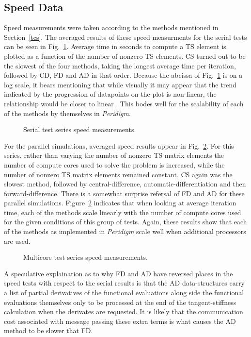\documentclass[preprint,12pt]{elsarticle}
\begin{document}
\subsection{Speed Data}
Speed measurements were taken according to the methods mentioned in Section~\ref{tcs}. The averaged results of these speed measurments for the serial tests can be seen in Fig.~\ref{fig:serial_speed}.  Average time in seconds to compute a TS element is plotted as a function of the number of nonzero TS elements.  CS turned out to be the slowest of the four methods, taking the longest average time per iteration,  followed by CD, FD and AD in that order. Because the abcissa of Fig.~\ref{fig:serial_speed} is on a log scale, it bears mentioning that while visually it may appear that the trend indicated by the progression of datapoints on the plot is non-linear, the relationship would be closer to linear . This bodes well for the scalability of each of the methods by themselves in \emph{Peridigm}. 
%
\begin{figure}[tbp]
  \centering
  \scalebox{1.0}{}
  \caption{Serial test series speed measurements.}
  \label{fig:serial_speed}
\end{figure}
%
For the parallel simulations, averaged speed results appear in Fig.~\ref{fig:multi_speed}. For this series, rather than varying the number of nonzero TS matrix elements the number of compute cores used to solve the problem is increased, while the number of nonzero TS matrix elements remained constant.  CS again was the slowest method, followed by central-difference, automatic-differentiation and then forward-difference.  There is a somewhat surprise refersal of FD and AD for these parallel simulations.  Figure~\ref{fig:multi_speed} indicates that when looking at average iteration time, each of the methods scale linearly with the number of compute cores used for the given conditions of this group of tests. Again, these results show that each of the methods as implemented in \emph{Peridigm} scale well when additional processors are used. 
%
\begin{figure}[tbp]
  \centering
  \scalebox{1.0}{}
  \caption{Multicore test series speed measurements.}
  \label{fig:multi_speed}
\end{figure}
%
A speculative explaination as to why FD and AD have reversed places in the speed tests with respect to the serial results is that the AD data-structures carry a list of partial derivatives of the functional evaluations along side the functional evaluations themselves only to be processed at the end of the tangent-stiffness calculation when the derivates are requested.  It is likely that the communication cost associated with message passing these extra terms is what causes the AD method to be slower that FD.
\end{document}
